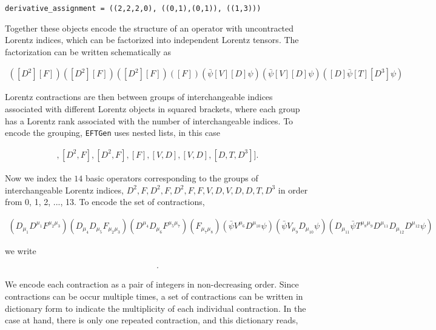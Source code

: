 \documentclass[11pt,BCOR=5mm]{article}
\begin{document}
\begin{lstlisting}[numbers=none]
derivative_assignment = ((2,2,2,0), ((0,1),(0,1)), ((1,3)))
\end{lstlisting}

\noindent Together these objects encode the structure of an operator with uncontracted Lorentz indices, which can be factorized into independent Lorentz tensors. The factorization can be written schematically as

\begin{align}
([D^{2}][F])([D^{2}][F])([D^{2}][F])([F])(\bar{\psi}[V][D]\psi)(\bar{\psi}[V][D]\psi)([D]\bar{\psi}[T][D^3]\psi)
\end{align}

\noindent Lorentz contractions are then between groups of interchangeable indices associated with different Lorentz objects in squared brackets, where each group has a Lorentz rank associated with the number of interchangeable indices. To encode the grouping,  \texttt{EFTGen} uses nested lists, in this case

\begin{align}
[[D^2, F], [D^2, F], [D^2, F], [F], [V, D], [V, D], [D, T, D^3]]. 
\end{align}

\noindent Now we index the $14$ basic operators corresponding to the groups of interchangeable Lorentz indices, $D^2, F, D^2, F, D^2, F, F, V, D, V, D, D, T, D^3$ in order from 0, 1, 2, ..., 13.  To encode the set of contractions,

\begin{footnotesize}
\begin{align} 
(D_{\mu_1} D^{\mu_1} F^{\mu_2 \mu_3})(D_{\mu_4} D_{\mu_5} F_{\mu_2 \mu_3})(D^{\mu_4} D_{\mu_6} F^{\mu_5 \mu_7})(F_{\mu_7 \mu_8})(\bar{\psi}V^{\mu_6}D^{\mu_{10}}\psi)(\bar{\psi}V_{\mu_9}D_{\mu_{10}}\psi)(D_{\mu_{11}}\bar{\psi}T^{\mu_8 \mu_9}D^{\mu_{11}}D_{\mu_{12}}D^{\mu_{12}}\psi)
\end{align}
\end{footnotesize}

\noindent we write 

\begin{align}
[(0,0), (1,3), (1,3), (2,4), (2,5), (4,7), (5,6), (6,12), (8,10), (9,12), (11,13), (13, 13)].
\end{align}

\noindent We encode each contraction as a pair of integers in non-decreasing order. Since contractions can be occur multiple times, a set of contractions can be written in dictionary form to indicate the multiplicity of each individual contraction. In the case at hand, there is only one repeated contraction, and this dictionary reads,
\end{document}
